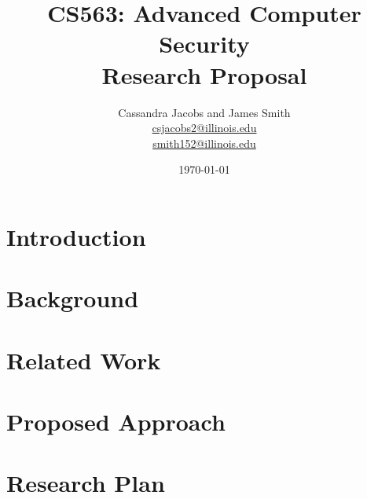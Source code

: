 \documentclass{article}
\title{\vspace{-3.0cm}CS563: Advanced Computer Security \\ Research Proposal}
\author{Cassandra Jacobs and James Smith\\
\href{mailto:csjacobs2@illinois.edu}{csjacobs2@illinois.edu } \\
\href{mailto:smith152@illinois.edu}{smith152@illinois.edu}}
\date{\today}
\begin{document}
\maketitle

\begin{multicols}{2}



\begin{abstract}

\label{abstract}
\end{abstract}


\section{Introduction}

\label{introduction}

\section{Background}

\label{background}

\section{Related Work}

\label{related-work}

\section{Proposed Approach}

\label{proposed-approach}

\section{Research Plan}

\label{proposed-plan}

\printbibliography

\end{multicols}
\end{document}
